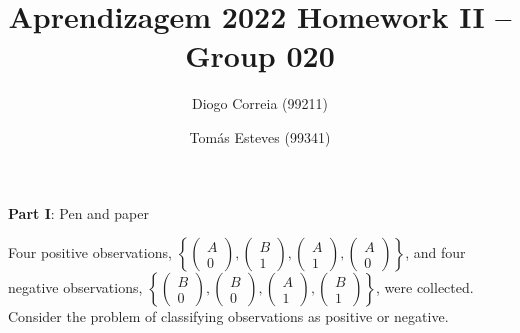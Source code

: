 \documentclass[12pt]{article}
\title{\large{Aprendizagem 2022}\vskip 0.2cm Homework II -- Group 020}
\date{}
\author{Diogo Correia (99211) \and Tomás Esteves (99341)}
\begin{document}
\maketitle
\begin{center}
    \large{\vskip -1.0cm\textbf{Part I}: Pen and paper}
\end{center}

Four positive observations, \(
\left\{
\begin{pmatrix}
    A \\
    0
\end{pmatrix}
,
\begin{pmatrix}
    B \\
    1
\end{pmatrix}
,
\begin{pmatrix}
    A \\
    1
\end{pmatrix}
,
\begin{pmatrix}
    A \\
    0
\end{pmatrix}
\right\}
\), and four negative observations, \(
\left\{
\begin{pmatrix}
    B \\
    0
\end{pmatrix}
,
\begin{pmatrix}
    B \\
    0
\end{pmatrix}
,
\begin{pmatrix}
    A \\
    1
\end{pmatrix}
,
\begin{pmatrix}
    B \\
    1
\end{pmatrix}
\right\}
\), were collected.
Consider the problem of classifying observations as positive or negative.
\end{document}
